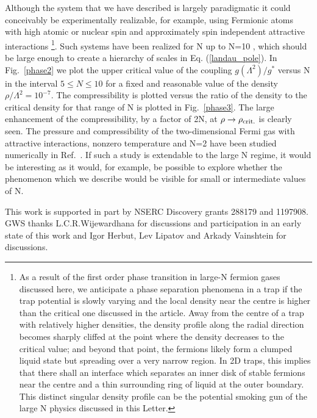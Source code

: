 \documentclass[twocolumn,secnumarabic,amssymb, nobibnotes, aps, prd]{revtex4}
\begin{document}
 
 Although the system that we have described is largely paradigmatic  it could conceivably 
 be experimentally realizable, for example,  
using Fermionic atoms  with high atomic or  nuclear spin  and  approximately spin independent attractive   interactions \footnote{As a result of the first order phase transition in large-N fermion gases
discussed here, we anticipate a phase separation phenomena
in a trap if the trap potential is slowly varying and the
local density near the centre is higher than the critical
one discussed in the article. Away from the centre of a trap with relatively
higher densities, the density profile along the radial direction
becomes sharply cliffed at the point where the
density decreases to the critical value; and beyond
that point, the fermions likely form a clumped liquid state
but spreading over a very narrow region.
In 2D traps, this implies that there
shall an interface which separates an inner disk
of stable fermions near the centre and a thin surrounding ring
of liquid at the outer boundary. This distinct singular
density profile can be the potential smoking gun of the
large N physics discussed in this Letter.}.  Such systems have been realized for N up to N=10 \cite{needs}, which should
be large enough to create a hierarchy of scales in Eq. (\ref{landau_pole}). 
In Fig.\  \ref{phase2} we plot the  upper critical value of the coupling $g(\Lambda^2)/g^*$ versus N  in the  interval $5\leq N\leq 10$ for a fixed and reasonable value of the density $\rho/\Lambda^2= 10^{-7}$.   The  compressibility is plotted versus the ratio of the density to the critical density for that range of N is plotted in Fig.\  \ref{phase3}.  The large enhancement of the compressibility, by a factor of 2N, at $\rho\to\rho_{\rm crit.}$ is clearly seen. The pressure and compressibility of the two-dimensional Fermi gas with attractive interactions, nonzero temperature and N=2 have been studied numerically in Ref.\  \cite{drut}. If such a study is extendable to the large N regime, it would be interesting as it would, for example, be possible to explore whether the phenomenon which we describe would be visible for small or intermediate values of N.  


\begin{acknowledgments}
 This work is supported in part by NSERC Discovery grants 288179 and  1197908.  
 GWS thanks L.C.R.Wijewardhana for discussions and participation in an early state of this 
 work and Igor Herbut, Lev Lipatov and Arkady Vainshtein for  discussions.  
 \end{acknowledgments}
\end{document}
